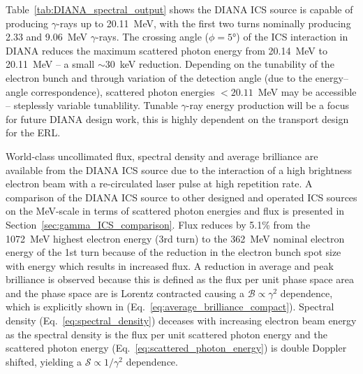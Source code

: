 \documentclass[../main.tex]{subfiles}
\begin{document}
Table~\ref{tab:DIANA_spectral_output} shows the DIANA ICS source is capable of producing $\gamma$-rays up to 20.11~\si{\mega\electronvolt}, with the first two turns nominally producing 2.33 and 9.06~\si{\mega\electronvolt} $\gamma$-rays. The crossing angle ($\phi=5\si{\degree}$) of the ICS interaction in DIANA reduces the maximum scattered photon energy from 20.14~\si{\mega\electronvolt} to 20.11~\si{\mega\electronvolt} -- a small $\sim 30$~\si{\kilo\electronvolt} reduction. Depending on the tunability of the electron bunch and through variation of the detection angle (due to the energy--angle correspondence), scattered photon energies $< 20.11$~\si{\mega\electronvolt} may be accessible -- steplessly variable tunablility. Tunable $\gamma$-ray energy production will be a focus for future DIANA design work, this is highly dependent on the transport design for the ERL. 

World-class uncollimated flux, spectral density and average brilliance are available from the DIANA ICS source due to the interaction of a high brightness electron beam with a re-circulated laser pulse at high repetition rate. A comparison of the DIANA ICS source to other designed and operated ICS sources on the \si{\mega\electronvolt}-scale in terms of scattered photon energies and flux is presented in Section~\ref{sec:gamma_ICS_comparison}. Flux reduces by 5.1\% from the 1072~\si{\mega\electronvolt} highest electron energy (3rd turn) to the 362~\si{\mega\electronvolt}  nominal electron energy of the 1st turn because of the reduction in the electron bunch spot size with energy which results in increased flux. A reduction in average and peak brilliance is observed because this is defined as the flux per unit phase space area and the phase space are is Lorentz contracted causing a $\mathcal{B}\propto \gamma^{2}$ dependence, which is explicitly shown in (Eq.~\ref{eq:average_brilliance_compact}). Spectral density (Eq.~\ref{eq:spectral_density}) deceases with increasing electron beam energy as the spectral density is the flux per unit scattered photon energy and the scattered photon energy (Eq.~\ref{eq:scattered_photon_energy}) is double Doppler shifted, yielding a $\mathcal{S}\propto 1/\gamma^{2}$ dependence.  
\end{document}
